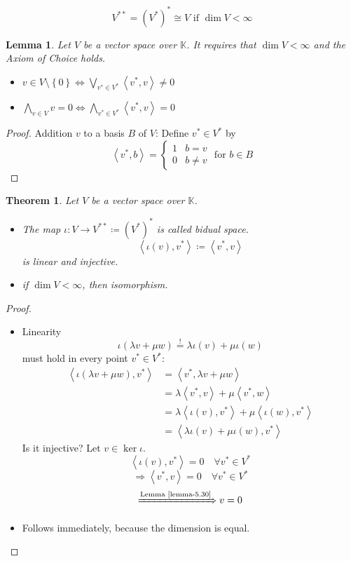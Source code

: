 \documentclass[a4paper,landscape,twocolumn]{article}
\newcommand\set[1]{\left\{#1\right\}}
\newcommand\functional[1]{\left\langle{#1}\right\rangle}
\newtheorem{theorem}{Theorem}
\newtheorem{lemma}{Lemma}
\DeclareMathOperator\kernel{ker} %
\begin{document}
\[ V^{**} = \left(V^*\right)^* \cong V \text{ if } \dim{V} < \infty \]

\begin{lemma}
  \label{lemma-5.30}
  Let $V$ be a vector space over $\mathbb K$. It requires that $\dim{V} < \infty$ and the Axiom of Choice holds.
  \begin{itemize}
    \item $v \in V \setminus \set{0} \Leftrightarrow \bigvee_{v^* \in V^*} \functional{v^*,v} \neq 0$
    \item $\bigwedge_{v \in V} v = 0 \Leftrightarrow \bigwedge_{v^* \in V^*} \functional{v^*,v} = 0$
  \end{itemize}
\end{lemma}
\begin{proof}
  Addition $v$ to a basis $B$ of $V$:
  Define $v^* \in V^*$ by
  \[ \functional{v^*,b} = \begin{cases} 1 & b = v \\ 0 & b \neq v \end{cases} \text{ for } b \in B \]
\end{proof}

\begin{theorem}
  \label{theorem-5.31}
  Let $V$ be a vector space over $\mathbb K$.
  \begin{itemize}
    \item The map $\iota: V \to V^{**} \coloneqq (V^*)^*$ is called \emph{bidual space}.
      \[ \functional{\iota(v), v^*} \coloneqq \functional{v^*,v} \]
      is linear and injective.
    \item if $\dim{V} < \infty$, then isomorphism.
  \end{itemize}
\end{theorem}
\begin{proof}
  \begin{itemize}
    \item Linearity
      \[ \iota(\lambda v + \mu w) \stackrel{!}{=} \lambda \iota(v) + \mu \iota (w) \]
      must hold in every point $v^* \in V^*$:
      \begin{align*}
        \functional{\iota(\lambda v + \mu w), v^*}
          &= \functional{v^*, \lambda v + \mu w} \\
          &= \lambda \functional{v^*,v} + \mu \functional{v^*, w} \\
          &= \lambda \functional{\iota(v), v^*} + \mu \functional{\iota(w), v^*} \\
          &= \functional{\lambda \iota(v) + \mu \iota(w), v^*}
      \end{align*}
      Is it injective?
      Let $v \in \kernel{\iota}$.
      \[ \functional{\iota(v), v^*} = 0 \quad \forall v^* \in V^* \]
      \[ \Rightarrow \functional{v^*,v} = 0 \quad \forall v^* \in V^* \]
      \[ \xRightarrow{\text{Lemma~\ref{lemma-5.30}}} v = 0 \]
    \item Follows immediately, because the dimension is equal.
  \end{itemize}
\end{proof}
\end{document}
